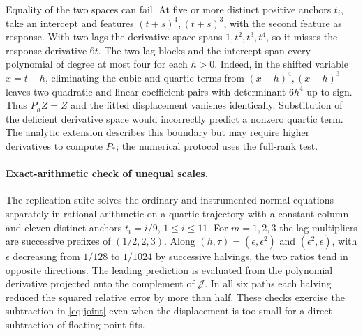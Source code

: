Equality of the two spaces can fail. At five or more distinct positive anchors $t_i$, take an intercept and features $(t+s)^4,(t+s)^3$, with the second feature as response. With two lags the derivative space spans $1,t^2,t^3,t^4$, so it misses the response derivative $6t$. The two lag blocks and the intercept span every polynomial of degree at most four for each $h>0$. Indeed, in the shifted variable $x=t-h$, eliminating the cubic and quartic terms from $(x-h)^4,(x-h)^3$ leaves two quadratic and linear coefficient pairs with determinant $6h^4$ up to sign. Thus $P_hZ=Z$ and the fitted displacement vanishes identically. Substitution of the deficient derivative space would incorrectly predict a nonzero quartic term. The analytic extension describes this boundary but may require higher derivatives to compute $P_*$; the numerical protocol uses the full-rank test.

\paragraph{Exact-arithmetic check of unequal scales.}
The replication suite solves the ordinary and instrumented normal equations separately in rational arithmetic on a quartic trajectory with a constant column and eleven distinct anchors $t_i=i/9$, $1\le i\le11$. For $m=1,2,3$ the lag multipliers are successive prefixes of $(1/2,2,3)$. Along $(h,\tau)=(\epsilon,\epsilon^2)$ and $(\epsilon^2,\epsilon)$, with $\epsilon$ decreasing from $1/128$ to $1/1024$ by successive halvings, the two ratios tend in opposite directions. The leading prediction is evaluated from the polynomial derivative projected onto the complement of $\mathcal J$. In all six paths each halving reduced the squared relative error by more than half. These checks exercise the subtraction in \eqref{eq:joint} even when the displacement is too small for a direct subtraction of floating-point fits.
